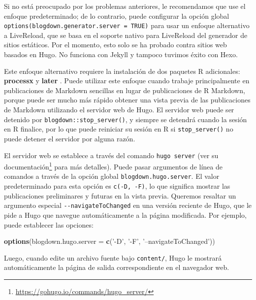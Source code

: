 \documentclass[12pt,]{krantz}
\makeatletter
\newenvironment{Shaded}{\begin{snugshade}}{\end{snugshade}}
\newcommand{\DataTypeTok}[1]{\textcolor[rgb]{0.13,0.29,0.53}{#1}}
\newcommand{\KeywordTok}[1]{\textcolor[rgb]{0.13,0.29,0.53}{\textbf{#1}}}
\newcommand{\NormalTok}[1]{#1}
\newcommand{\StringTok}[1]{\textcolor[rgb]{0.31,0.60,0.02}{#1}}
\renewcommand{\href}[2]{#2\footnote{\url{#1}}}
\newenvironment{kframe}{%
\medskip{}
\setlength{\fboxsep}{.8em}
 \def\at@end@of@kframe{}%
 \ifinner\ifhmode%
  \def\at@end@of@kframe{\end{minipage}}%
  \begin{minipage}{\columnwidth}%
 \fi\fi%
 \def\FrameCommand##1{\hskip\@totalleftmargin \hskip-\fboxsep
 \colorbox{shadecolor}{##1}\hskip-\fboxsep
     \hskip-\linewidth \hskip-\@totalleftmargin \hskip\columnwidth}%
 \MakeFramed {\advance\hsize-\width
   \@totalleftmargin\z@ \linewidth\hsize
   \@setminipage}}%
 {\par\unskip\endMakeFramed%
 \at@end@of@kframe}
\renewenvironment{Shaded}{\begin{kframe}}{\end{kframe}}
\theoremstyle{definition}
\theoremstyle{definition}
\theoremstyle{definition}
\theoremstyle{remark}
\makeatother
\begin{document}
Si no está preocupado por los problemas anteriores, le recomendamos que
use el enfoque predeterminado; de lo contrario, puede configurar la
opción global \texttt{options(blogdown.generator.server\ =\ TRUE)} para
usar un enfoque alternativo a LiveReload, que se basa en el soporte
nativo para LiveReload del generador de sitios estáticos. Por el
momento, esto solo se ha probado contra sitios web basados en Hugo. No
funciona con Jekyll y tampoco tuvimos éxito con Hexo.

Este enfoque alternativo requiere la instalación de dos paquetes R
adicionales: \textbf{processx} \citep{R-processx} y \textbf{later}
\citep{R-later}. Puede utilizar este enfoque cuando trabaje
principalmente en publicaciones de Markdown sencillas en lugar de
publicaciones de R Markdown, porque puede ser mucho más rápido obtener
una vista previa de las publicaciones de Markdown utilizando el servidor
web de Hugo. El servidor web puede ser detenido por
\texttt{blogdown::stop\_server()}, y siempre se detendrá cuando la
sesión en R finalice, por lo que puede reiniciar su sesión en R si
\texttt{stop\_server()} no puede detener el servidor por alguna razón.

El servidor web se establece a través del comando \texttt{hugo\ server}
(ver \href{https://gohugo.io/commands/hugo_server/}{su documentación}
para más detalles). Puede pasar argumentos de línea de comandos a través
de la opción global \texttt{blogdown.hugo.server}. El valor
predeterminado para esta opción es
\texttt{c(\textquotesingle{}-D\textquotesingle{},\ \textquotesingle{}-F\textquotesingle{})},
lo que significa mostrar las publicaciones preliminares y futuras en la
vista previa. Queremos resaltar un argumento especial
\texttt{-\/-navigateToChanged} en una versión reciente de Hugo, que le
pide a Hugo que navegue automáticamente a la página modificada. Por
ejemplo, puede establecer las opciones:

\begin{Shaded}
\begin{Highlighting}[]
\KeywordTok{options}\NormalTok{(}\DataTypeTok{blogdown.hugo.server =} \KeywordTok{c}\NormalTok{(}\StringTok{'-D'}\NormalTok{, }\StringTok{'-F'}\NormalTok{, }\StringTok{'--navigateToChanged'}\NormalTok{))}
\end{Highlighting}
\end{Shaded}

Luego, cuando edite un archivo fuente bajo \texttt{content/}, Hugo le
mostrará automáticamente la página de salida correspondiente en el
navegador web.
\end{document}
